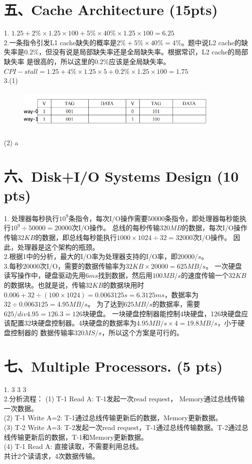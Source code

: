 \documentclass[UTF8]{ctexart}
\begin{document}
\section*{五、Cache Architecture (15pts)}
1. $1.25+2\%\times1.25\times100+5\%\times40\%\times1.25\times100=6.25$\\
2.一条指令引发L1 cache缺失的概率是$2\%+5\%\times40\%=4\%$。题中说L2 cache的缺失率是$0.2\%$，但没有说是局部缺失率还是全局缺失率。根据常识，L2 cache的局部缺失率
是很高的，所以这里的$0.2\%$应该是全局缺失率。\\
$CPI-stall=1.25+4\%\times1.25\times5+0.2\%\times1.25\times100=1.75$\\
3.(1)
\begin{figure}[H]                                            
    \centering                                                
    \includegraphics[width=10cm,height=2cm]{5-3.png}        
    \caption*{}                                                                                 
\end{figure}  
(2) a
\section*{六、Disk+I/O Systems Design (10 pts)}
1. 处理器每秒执行$10^9$条指令，每次I/O操作需要$50000$条指令，即处理器每秒能执行$10^9\div50000=20000$次I/O操作。
总线的每秒传输$320MB$的数据，每次I/O操作传输$32KB$的数据，即总线每秒能执行$1000\times1024\div32=32000$次I/O操作。
因此，处理器是这个架构的瓶颈。\\
2.根据1中的分析，最大的I/O率为处理器支持的I/O率，即$20000/s$。\\
3.每秒$20000$次I/O，需要的数据传输率为$32KB\times20000=625MB/s$。
一次硬盘读写操作中，硬盘驱动先用$6ms$找到数据，然后用$100MB/s$的速度传输一个$32KB$的数据块。也就是说，传输$32KB$的数据块用时
$0.006+32\div(100\times1024)=0.0063125s=6.3125ms$，数据率为$32\div0.0063125=4.95MB/s$。
为了达到$625MB/s$的数据率，需要$625/div4.95=126.3=126$块硬盘。
一块硬盘控制器能控制4块硬盘，126块硬盘应该配置32块硬盘控制器。4块硬盘的数据率为$4.95MB/s\times4=19.8MB/s$，小于硬盘控制器的
数据传输率$320MS/s$，所以这个方案是可行的。
\section*{七、Multiple Processors. (5 pts)}
1. 3 3 3\\
2.分析流程：
(1) T-1 Read A: T-1发起一次read request， Memory通过总线传输一次数据。\\
(2) T-1 Write A=2: T-1通过总线传输更新后的数据，Memory更新数据。\\
(3) T-2 Write A=3: T-2发起一次read request，T-1通过总线传输数据。T-2通过总线传输更新后的数据，T-1和Memory更新数据。\\
(4) T-1 Read A: 直接读取，不需要利用总线。\\
共计2个读请求，4次数据传输。\\
\end{document}
